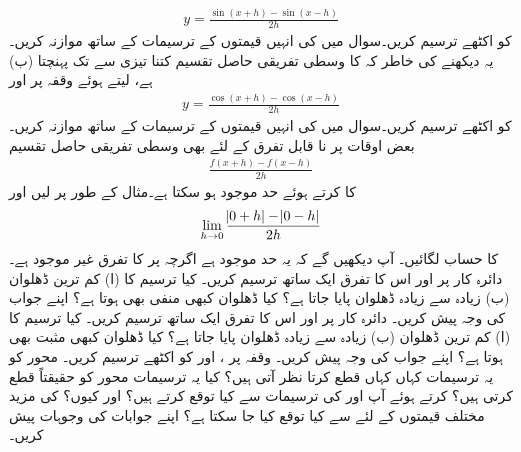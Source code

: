 \begin{align*}
y=\frac{\sin(x+h)-\sin(x-h)}{2h}
\end{align*}
کو اکٹھے ترسیم کریں۔سوال  میں  کی انہیں قیمتوں کے ترسیمات کے  ساتھ موازنہ کریں۔\\
(ب)  یہ دیکھنے کی خاطر کہ  کا وسطی تفریقی  حاصل تقسیم  کتنا تیزی سے  تک پہنچتا ہے،  لیتے ہوئے وقفہ  پر  اور 
\begin{align*}
y=\frac{\cos(x+h)-\cos(x-h)}{2h}
\end{align*}
کو اکٹھے ترسیم کریں۔سوال  میں  کی انہیں قیمتوں کے ترسیمات کے  ساتھ موازنہ کریں۔
بعض اوقات  پر نا قابل تفرق  کے لئے بھی وسطی تفریقی حاصل تقسیم
\begin{align*}
\frac{f(x+h)-f(x-h)}{2h}
\end{align*}
 کا  کرتے ہوئے حد موجود ہو سکتا ہے۔مثال کے طور پر  لیں اور 
\begin{align*}
\lim_{h\to 0}\frac{\abs{0+h}-\abs{0-h}}{2h}
\end{align*}
کا حساب لگائیں۔ آپ دیکھیں گے کہ یہ حد موجود ہے اگرچہ  پر  کا تفرق غیر موجود ہے۔
دائرہ کار  پر  اور اس کا تفرق ایک ساتھ ترسیم کریں۔ کیا ترسیم کا  (ا) کم ترین ڈھلوان (ب) زیادہ سے زیادہ ڈھلوان پایا جاتا ہے؟  کیا ڈھلوان کبھی منفی بھی ہوتا ہے؟ اپنے جواب کی وجہ پیش کریں۔
دائرہ کار   پر  اور اس کا تفرق ایک ساتھ ترسیم کریں۔ کیا ترسیم کا  (ا) کم ترین ڈھلوان (ب) زیادہ سے زیادہ ڈھلوان پایا جاتا ہے؟  کیا ڈھلوان کبھی مثبت  بھی ہوتا ہے؟ اپنے جواب کی وجہ پیش کریں۔
وقفہ  پر ،  اور  کو اکٹھے ترسیم کریں۔  محور کو یہ ترسیمات کہاں کہاں قطع کرتا نظر آتی ہیں؟ کیا یہ ترسیمات محور کو حقیقتاً  قطع کرتی ہیں؟  کرتے ہوئے آپ  اور  کی ترسیمات سے کیا توقع کرتے ہیں؟ اور کیوں؟  کی مزید مختلف قیمتوں کے لئے  سے کیا توقع کیا جا سکتا ہے؟ اپنے جوابات کی وجوہات پیش کریں۔
